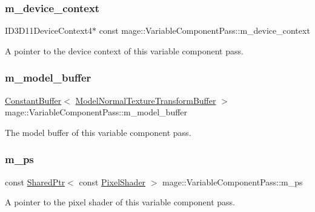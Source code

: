 \subsubsection{\texorpdfstring{m\+\_\+device\+\_\+context}{m\_device\_context}}
{\footnotesize\ttfamily I\+D3\+D11\+Device\+Context4$\ast$ const mage\+::\+Variable\+Component\+Pass\+::m\+\_\+device\+\_\+context\hspace{0.3cm}{\ttfamily [private]}}

A pointer to the device context of this variable component pass. \hypertarget{classmage_1_1_variable_component_pass_a2ddb72a3c1464e7ab0f788df25ae733a}{}\label{classmage_1_1_variable_component_pass_a2ddb72a3c1464e7ab0f788df25ae733a} 
\subsubsection{\texorpdfstring{m\+\_\+model\+\_\+buffer}{m\_model\_buffer}}
{\footnotesize\ttfamily \hyperlink{classmage_1_1_constant_buffer}{Constant\+Buffer}$<$ \hyperlink{structmage_1_1_model_normal_texture_transform_buffer}{Model\+Normal\+Texture\+Transform\+Buffer} $>$ mage\+::\+Variable\+Component\+Pass\+::m\+\_\+model\+\_\+buffer\hspace{0.3cm}{\ttfamily [private]}}

The model buffer of this variable component pass. \hypertarget{classmage_1_1_variable_component_pass_a005eac17e55f81d3bc8b5989400ed087}{}\label{classmage_1_1_variable_component_pass_a005eac17e55f81d3bc8b5989400ed087} 
\subsubsection{\texorpdfstring{m\+\_\+ps}{m\_ps}}
{\footnotesize\ttfamily const \hyperlink{namespacemage_a1e01ae66713838a7a67d30e44c67703e}{Shared\+Ptr}$<$ const \hyperlink{namespacemage_a27ecaf266420ee7a494d64edc0757129}{Pixel\+Shader} $>$ mage\+::\+Variable\+Component\+Pass\+::m\+\_\+ps\hspace{0.3cm}{\ttfamily [private]}}

A pointer to the pixel shader of this variable component pass. \hypertarget{classmage_1_1_variable_component_pass_a6e9a67c5251951f887d64c1a6d50a33c}{}\label{classmage_1_1_variable_component_pass_a6e9a67c5251951f887d64c1a6d50a33c} 
